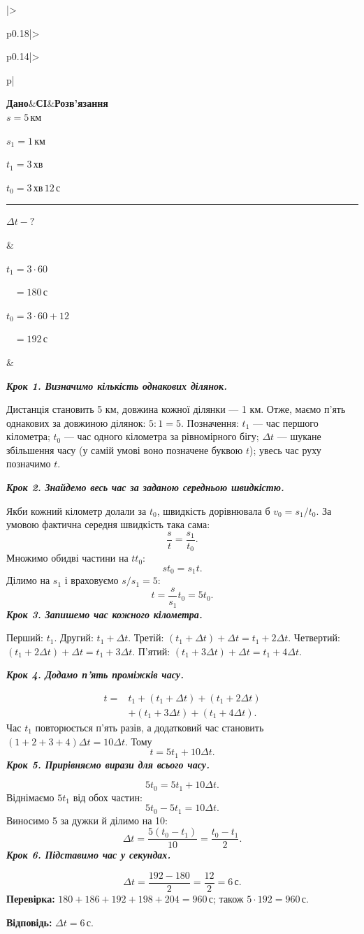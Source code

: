 \documentclass[12pt,a4paper]{article}
\newenvironment{solutionwide}{\small\begin{tabular}{|>{\raggedright\arraybackslash}p{0.18\linewidth}|>{\raggedright\arraybackslash}p{0.14\linewidth}|>{\raggedright\arraybackslash}p{\dimexpr0.68\linewidth-6\tabcolsep-4\arrayrulewidth\relax}|}\hline
\textbf{Дано}&\textbf{СІ}&\textbf{Розв'язання}\\\hline}{\\\hline\end{tabular}\par}
\newcommand{\target}[1]{\par\rule{\linewidth}{0.3pt}\par $#1-?$}
\newcommand{\why}[1]{\textbf{\textit{#1}}\par}
\begin{document}
\begin{solutionwide}
$s=5\,\text{км}$\par
$s_1=1\,\text{км}$\par
$t_1=3\,\text{хв}$\par
$t_0=3\,\text{хв}\,12\,\text{с}$
\target{\Delta t}

&

$t_1=3\cdot60$\par
$\phantom{t_1}=180\,\text{с}$\par
$t_0=3\cdot60+12$\par
$\phantom{t_0}=192\,\text{с}$

&

\setlength{\abovedisplayskip}{4pt}\setlength{\belowdisplayskip}{4pt}
\why{Крок 1. Визначимо кількість однакових ділянок.}
Дистанція становить 5 км, довжина кожної ділянки --- 1 км. Отже, маємо п’ять однакових за довжиною ділянок: $5:1=5$.
Позначення: $t_1$ --- час першого кілометра; $t_0$ --- час одного кілометра за рівномірного бігу; $\Delta t$ --- шукане збільшення часу (у самій умові воно позначене буквою $t$); увесь час руху позначимо $t$.
\par
\why{Крок 2. Знайдемо весь час за заданою середньою швидкістю.}
Якби кожний кілометр долали за $t_0$, швидкість дорівнювала б $v_0=s_1/t_0$. За умовою фактична середня швидкість така сама:
\[\frac{s}{t }=\frac{s_1}{t_0}.\]
Множимо обидві частини на $t t_0$:
\[st_0=s_1 t .\]
Ділимо на $s_1$ і враховуємо $s/s_1=5$:
\[t =\frac{s}{s_1}t_0=5t_0.\]
\why{Крок 3. Запишемо час кожного кілометра.}
Перший: $t_1$. Другий: $t_1+\Delta t$.
Третій: $(t_1+\Delta t)+\Delta t=t_1+2\Delta t$.
Четвертий: $(t_1+2\Delta t)+\Delta t=t_1+3\Delta t$.
П'ятий: $(t_1+3\Delta t)+\Delta t=t_1+4\Delta t$.
\par
\why{Крок 4. Додамо п'ять проміжків часу.}
\[
\begin{aligned}
t ={}&t_1+(t_1+\Delta t)+(t_1+2\Delta t)\\
&+(t_1+3\Delta t)+(t_1+4\Delta t).
\end{aligned}
\]
Час $t_1$ повторюється п'ять разів, а додатковий час становить $(1+2+3+4)\Delta t=10\Delta t$. Тому
\[t =5t_1+10\Delta t.\]
\why{Крок 5. Прирівняємо вирази для всього часу.}
\[5t_0=5t_1+10\Delta t.\]
Віднімаємо $5t_1$ від обох частин:
\[5t_0-5t_1=10\Delta t.\]
Виносимо 5 за дужки й ділимо на 10:
\[\Delta t=\frac{5(t_0-t_1)}{10}=\frac{t_0-t_1}{2}.\]
\why{Крок 6. Підставимо час у секундах.}
\[\Delta t=\frac{192-180}{2}=\frac{12}{2}=6\,\text{с}.\]
\textbf{Перевірка:} $180+186+192+198+204=960\,\text{с}$; також $5\cdot192=960\,\text{с}$.
\par\textbf{Відповідь:} $\Delta t=6\,\text{с}$.
\end{solutionwide}
\newpage
\end{document}

